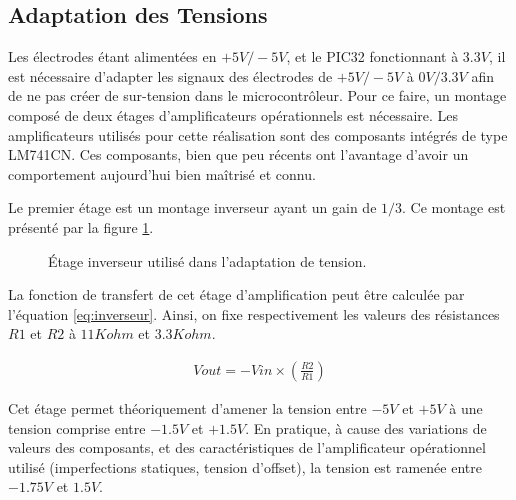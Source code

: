 \documentclass[letterpaper, twoside, 12pt, memoire, creativecommons, hyperref]{thETS}
\begin{document}
\subsection{Adaptation des Tensions}

Les électrodes étant alimentées en $+5V/-5V$, et le PIC32 fonctionnant à $3.3V$, il est nécessaire d’adapter les signaux des électrodes de $+5V/-5V$ à $0V/3.3V$ afin de ne pas créer de sur-tension dans le microcontrôleur. Pour ce faire, un montage composé de deux étages d'amplificateurs opérationnels est nécessaire.  Les amplificateurs utilisés pour cette réalisation sont des composants intégrés de type LM741CN. Ces composants, bien que peu récents ont l'avantage d'avoir un comportement aujourd'hui bien maîtrisé et connu. 

Le premier étage est un montage inverseur ayant un gain de $1/3$. Ce montage est présenté par la figure \ref{fig:inverseur}.

\begin{figure}
	\centering
	\caption{Étage inverseur utilisé dans l'adaptation de tension.}
	\label{fig:inverseur}
\end{figure}

La fonction de transfert de cet étage d'amplification peut être calculée par l'équation \ref{eq:inverseur}. Ainsi, on fixe respectivement les valeurs des résistances $R1$ et $R2$ à $11Kohm$ et $3.3Kohm$.

\begin{align}\label{eq:inverseur}
   Vout = -Vin \times ( \frac{R2}{R1} )
\end{align}

Cet étage permet théoriquement d'amener la tension entre $-5V$ et $+5V$ à une tension comprise entre $-1.5V$ et $+1.5V$. En pratique, à cause des variations de valeurs des composants, et des caractéristiques de l'amplificateur opérationnel utilisé (imperfections statiques, tension d'offset), la tension est ramenée entre $-1.75V$ et $1.5V$.
\end{document}
